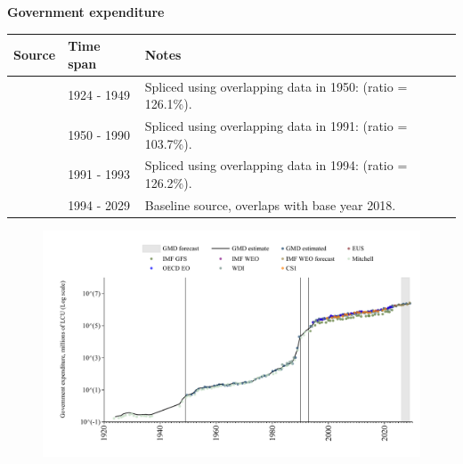 \documentclass[12pt,a4paper,landscape]{article}
\begin{document}
\begin{adjustbox}{max totalsize={\paperwidth}{\paperheight},center}
\begin{minipage}[t][\textheight][t]{\textwidth}
\vspace*{0.5cm}
{}
\begin{center}
{\Large\bfseries Government expenditure}
\end{center}
\vspace{0.5cm}
\begin{table}[H]
\centering
\small
\begin{tabular}{|l|l|l|}
\hline
\textbf{Source} & \textbf{Time span} & \textbf{Notes} \\
\hline
\rowcolor{white}\cite{Mitchell}& 1924 - 1949 &Spliced using overlapping data in 1950: (ratio = 126.1\%). \\
\rowcolor{lightgray}\cite{GMD_estimated}& 1950 - 1990 &Spliced using overlapping data in 1991: (ratio = 103.7\%). \\
\rowcolor{white}\cite{Mitchell}& 1991 - 1993 &Spliced using overlapping data in 1994: (ratio = 126.2\%). \\
\rowcolor{lightgray}\cite{GMD_estimated}& 1994 - 2029 &Baseline source, overlaps with base year 2018. \\
\hline
\end{tabular}
\end{table}
\begin{figure}[H]
\centering
\includegraphics[width=\textwidth,height=0.6\textheight,keepaspectratio]{graphs/POL_govexp.pdf}
\end{figure}
\end{minipage}
\end{adjustbox}
\end{document}
